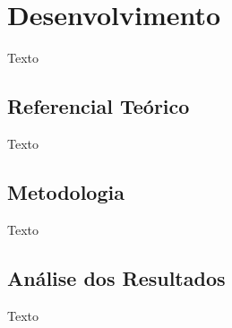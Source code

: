 \chapter{Desenvolvimento}

Texto

\section{Referencial Teórico}

Texto

\section{Metodologia}

Texto

\section{Análise dos Resultados}

Texto